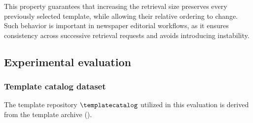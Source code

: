 This property guarantees that increasing the retrieval size preserves every previously selected template, while allowing their relative ordering to change. Such behavior is important in newspaper editorial workflows, as it ensures consistency across successive retrieval requests and avoids introducing instability.


\subsection{Experimental evaluation}
\label{section:trs-eval}
\subsubsection{Template catalog dataset}
The template repository $\templatecatalog$ utilized in this evaluation is derived from the \publihebdos template archive ().






